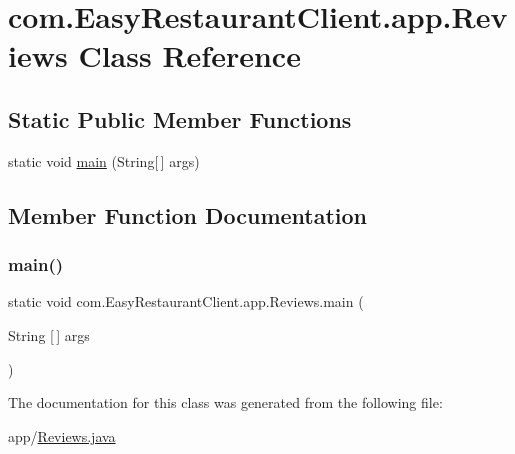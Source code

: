 \hypertarget{classcom_1_1_easy_restaurant_client_1_1app_1_1_reviews}{}\section{com.\+Easy\+Restaurant\+Client.\+app.\+Reviews Class Reference}
\label{classcom_1_1_easy_restaurant_client_1_1app_1_1_reviews}
\subsection*{Static Public Member Functions}
\begin{DoxyCompactItemize}
\item 
static void \mbox{\hyperlink{classcom_1_1_easy_restaurant_client_1_1app_1_1_reviews_a9be73d8eef26bb471a48039fc24ff235}{main}} (String\mbox{[}$\,$\mbox{]} args)
\end{DoxyCompactItemize}


\subsection{Member Function Documentation}
\mbox{\label{classcom_1_1_easy_restaurant_client_1_1app_1_1_reviews_a9be73d8eef26bb471a48039fc24ff235}} 
\subsubsection{\texorpdfstring{main()}{main()}}
{\footnotesize\ttfamily static void com.\+Easy\+Restaurant\+Client.\+app.\+Reviews.\+main (\begin{DoxyParamCaption}\item[{String \mbox{[}$\,$\mbox{]}}]{args }\end{DoxyParamCaption})\hspace{0.3cm}{\ttfamily [static]}}



The documentation for this class was generated from the following file\+:\begin{DoxyCompactItemize}
\item 
app/\mbox{\hyperlink{_reviews_8java}{Reviews.\+java}}\end{DoxyCompactItemize}
